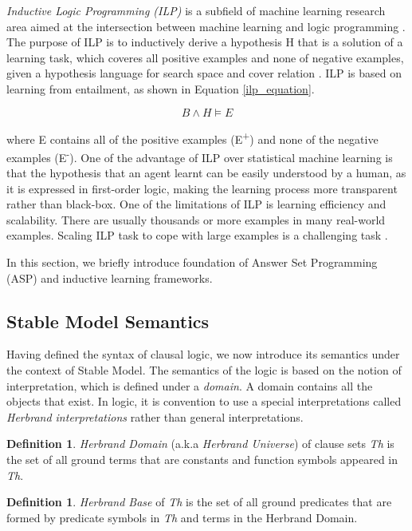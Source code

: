 \documentclass[12pt,twoside]{report}
\theoremstyle{plain}
\theoremstyle{definition}
\newtheorem{defn}[thm]{Definition} %
\begin{document}
\textit{Inductive Logic Programming (ILP)} is a subfield of machine learning research area aimed at the intersection between machine learning and logic programming \cite{Muggleton1991}. The purpose of ILP is to inductively derive a hypothesis H that is a solution of a learning task, which coveres all positive examples and none of negative examples, given a hypothesis language for search space and cover relation \cite{DeRaedt1997}. ILP is based on learning from entailment, as shown in Equation \ref{ilp_equation}.

\begin{equation}
B \wedge H \models E
\end{equation}
\label{ilp_equation}

where E contains all of the positive examples (E\textsuperscript{+}) and none of the negative examples (E\textsuperscript{-}).
One of the advantage of ILP over statistical machine learning is that the hypothesis that an agent learnt can be easily understood by a human, as it is expressed in first-order logic, making the learning process more transparent rather than black-box.
One of the limitations of ILP is learning efficiency and scalability. There are usually thousands or more examples in many real-world examples. Scaling ILP task to cope with large examples is a challenging task \cite{Muggleton1993}.

In this section, we briefly introduce foundation of Answer Set Programming (ASP) and inductive learning frameworks.

\subsection{Stable Model Semantics}

Having defined the syntax of clausal logic, we now introduce its semantics under the context of Stable Model. The semantics of the logic is based on the notion of interpretation, which is defined under a \textit{domain}. A domain contains all the objects that exist. In logic, it is convention to use a special interpretations called \textit{Herbrand interpretations} rather than general interpretations.

\begin{defn}
\textit{Herbrand Domain} (a.k.a \textit{Herbrand Universe}) of clause sets \textit{Th} is the set of all ground terms that are constants and function symbols appeared in \textit{Th}.
\end{defn}

\begin{defn}
\textit{Herbrand Base} of \textit{Th} is the set of all ground predicates that are formed by predicate symbols in \textit{Th} and terms in the Herbrand Domain.
\end{defn}
\end{document}
